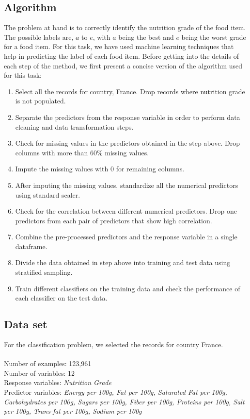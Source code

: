 \documentclass[sigconf]{acmart}
\begin{document}
\subsection{Algorithm}
The problem at hand is to correctly identify the nutrition grade of the food item. The possible labels are, $a$ to $e$, with $a$ being the best and $e$ being the worst grade for a food item. For this task, we have used machine learning techniques that help in predicting the label of each food item. Before getting into the details of each step of the method, we first present a concise version of the algorithm used for this task:

\begin{enumerate}
  \item Select all the records for country, France. Drop records where nutrition grade is not populated.
  \item Separate the predictors from the response variable in order to perform data cleaning and data transformation steps.
  \item Check for missing values in the predictors obtained in the step above. Drop columns with more than 60\% missing values.
   \item Impute the missing values with 0 for remaining columns.
   \item After imputing the missing values, standardize all the numerical predictors using standard scaler.
   \item Check for the correlation between different numerical predictors. Drop one predictors from each pair of predictors that show high correlation.
   \item Combine the pre-processed predictors and the response variable in a single dataframe.
   \item Divide the data obtained in step above into training and test data using stratified sampling.
   \item Train different classifiers on the training data and check the performance of each classifier on the test data.
\end{enumerate}

\subsection{Data set}
For the classification problem, we selected the records for country France. \\ \\
Number of examples: 123,961 \\
Number of variables: 12 \\
Response variables: {\em Nutrition Grade} \\
Predictor variables: {\em Energy per 100g, Fat per 100g, Saturated Fat per 100g, Carbohydrates per 100g, Sugars per 100g, Fiber per 100g, Proteins per 100g, Salt per 100g, Trans-fat per 100g, Sodium per 100g}
\end{document}
